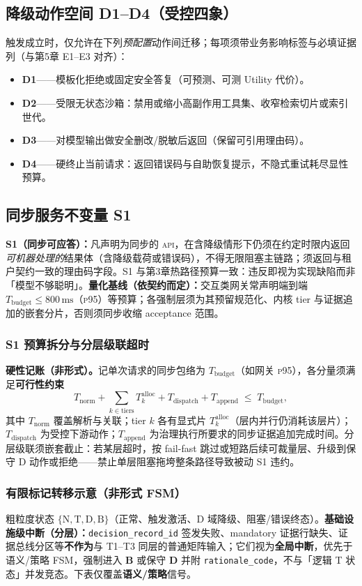 \documentclass[11pt,a4paper]{report}
\begin{document}
\subsection{降级动作空间 D1--D4（受控四象）}
触发成立时，仅允许在下列\emph{预配置}动作间迁移；每项须带业务影响标签与必填证据列（与第5章 E1--E3 对齐）：
\begin{itemize}
  \item \textbf{D1}——模板化拒绝或固定安全答复（可预测、可测 Utility 代价）。
  \item \textbf{D2}——受限无状态沙箱：禁用或缩小高副作用工具集、收窄检索切片或索引世代。
  \item \textbf{D3}——对模型输出做安全删改/脱敏后返回（保留可引用理由码）。
  \item \textbf{D4}——硬终止当前请求：返回错误码与自助恢复提示，不隐式重试耗尽显性预算。
\end{itemize}

\subsection{同步服务不变量 S1}
\textbf{S1（同步可应答）：}凡声明为同步的 \textsc{api}，在含降级情形下仍须在约定时限内返回\emph{可机器处理的}结果体（含降级载荷或错误码），不得无限阻塞主链路；须返回与租户契约一致的理由码字段。S1 与第3章热路径预算一致：违反即视为实现缺陷而非「模型不够聪明」。\textbf{量化基线（依契约而定）：}交互类网关常声明端到端 $T_{\mathrm{budget}} \le 800\,\mathrm{ms}$（\textsc{p95}）等预算；各强制层须为其预留规范化、内核 tier 与证据追加的嵌套分片，否则须同步收缩 acceptance 范围。

\subsubsection*{S1 预算拆分与分层级联超时}
\textbf{硬性记账（非形式）。}记单次请求的同步包络为 $T_{\mathrm{budget}}$（如网关 \textsc{p95}），各分量须满足\textbf{可行性约束}
\[
  T_{\mathrm{norm}} + \sum_{k \in \mathrm{tiers}} T_k^{\mathrm{alloc}} + T_{\mathrm{dispatch}} + T_{\mathrm{append}} \;\le\; T_{\mathrm{budget}},
\]
其中 $T_{\mathrm{norm}}$ 覆盖解析与关联；tier $k$ 各有显式片 $T_k^{\mathrm{alloc}}$（层内并行仍消耗该层片）；$T_{\mathrm{dispatch}}$ 为受控下游动作；$T_{\mathrm{append}}$ 为治理执行所要求的同步证据追加完成时间。分层级联须嵌套截止：若某层超时，按 fail-fast 跳过或短路后续可裁量层、升级到保守 D 动作或拒绝——禁止单层阻塞拖垮整条路径导致被动 S1 违约。

\subsubsection*{有限标记转移示意（非形式 FSM）}
粗粒度状态 \(\{\mathrm{N},\mathrm{T},\mathrm{D},\mathrm{B}\}\)（正常、触发激活、D 域降级、阻塞/错误终态）。\textbf{基础设施级中断（分层）：}\texttt{decision\_record\_id} 签发失败、mandatory 证据行缺失、证据总线分区等\textbf{不作为}与 T1--T3 同层的普通矩阵输入；它们视为\textbf{全局中断}，优先于语义/策略 FSM，强制进入 \textbf{B} 或保守 \textbf{D} 并附 \texttt{rationale\_code}，不与「逻辑 T 状态」并发竞态。下表仅覆盖\textbf{语义/策略}信号。
\end{document}
